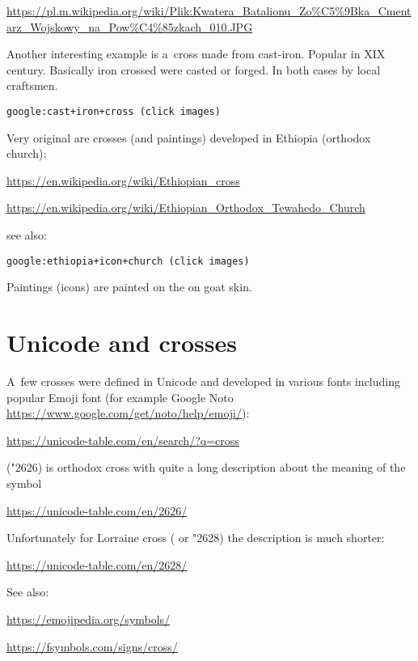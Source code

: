 \documentclass[a4page]{article}
\begin{document}
\url{https://pl.m.wikipedia.org/wiki/Plik:Kwatera_Batalionu_Zo%C5%9Bka_Cmentarz_Wojskowy_na_Pow%C4%85zkach_010.JPG}

Another interesting example is a~cross made from cast-iron. Popular in XIX century.
Basically iron crossed were casted or forged. In both cases by local craftsmen.

\texttt{google:cast+iron+cross (click images)} 

Very original are crosses (and paintings) developed in Ethiopia (orthodox church):

\url{https://en.wikipedia.org/wiki/Ethiopian_cross}

\url{https://en.wikipedia.org/wiki/Ethiopian_Orthodox_Tewahedo_Church}

see also:

\texttt{google:ethiopia+icon+church (click images)}

Paintings (icons) are painted on the on goat skin.


\section{Unicode and crosses}

A~few crosses were defined in Unicode and 
developed in various fonts including popular
Emoji font (for example Google Noto \url{https://www.google.com/get/noto/help/emoji/}):

\url{https://unicode-table.com/en/search/?q=cross}

 ({\emojiFont\char"2626}) is orthodox cross with quite a long description
about the meaning of the symbol

\url{https://unicode-table.com/en/2626/}

Unfortunately for Lorraine cross ( or {\emojiFont\char"2628})
the description is much shorter:

\url{https://unicode-table.com/en/2628/}

See also:

\url{https://emojipedia.org/symbols/}

\url{https://fsymbols.com/signs/cross/}
\end{document}
